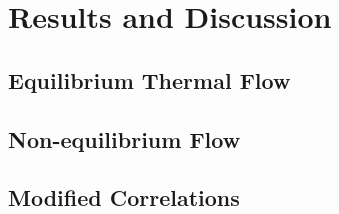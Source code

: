 \chapter{Results and Discussion}

\section{Equilibrium Thermal Flow}

\section{Non-equilibrium Flow}

\section{Modified Correlations}